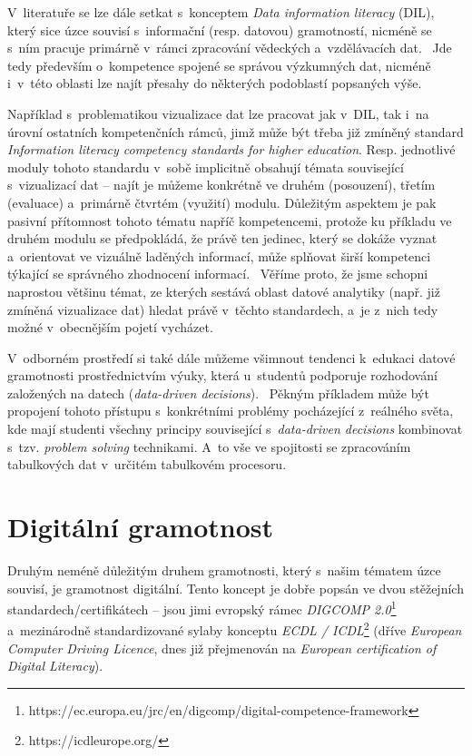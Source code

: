 V~literatuře se lze dále setkat s~konceptem \emph{Data information literacy} (DIL), který sice úzce souvisí s~informační (resp. datovou) gramotností, nicméně se s~ním pracuje primárně v~rámci zpracování vědeckých a~vzdělávacích dat.~\parencite{jeffryes13} Jde tedy především o~kompetence spojené se správou výzkumných dat, nicméně i~v~této oblasti lze najít přesahy do některých podoblastí popsaných výše.

Například s~problematikou vizualizace dat lze pracovat jak v~DIL, tak i~na úrovní ostatních kompetenčních rámců, jimž může být třeba již zmíněný standard \emph{Information literacy competency standards for higher education}. Resp. jednotlivé moduly tohoto standardu v~sobě implicitně obsahují témata související s~vizualizací dat -- najít je můžeme konkrétně ve druhém (posouzení), třetím (evaluace) a~primárně čtvrtém (využití) modulu. Důležitým aspektem je pak pasivní přítomnost tohoto tématu napříč kompetencemi, protože ku příkladu ve druhém modulu se předpokládá, že právě ten jedinec, který se dokáže vyznat a~orientovat ve vizuálně laděných informací, může splňovat širší kompetenci týkající se správného zhodnocení informací.~\parencite{womack14} Věříme proto, že jsme schopni naprostou většinu témat, ze kterých sestává oblast datové analytiky (např. již zmíněná vizualizace dat) hledat právě v~těchto standardech, a~je z~nich tedy možné v~obecnějším pojetí vycházet.

V~odborném prostředí si také dále můžeme všimnout tendenci k~edukaci datové gramotnosti prostřednictvím výuky, která u~studentů podporuje rozhodování založených na datech (\emph{data-driven decisions}).~\parencite{mandinach13} Pěkným příkladem může být propojení tohoto přístupu s~konkrétními problémy pocházející z~reálného světa, kde mají studenti všechny principy související s~\emph{data-driven decisions} kombinovat s~tzv. \emph{problem solving} technikami. A~to vše ve spojitosti se zpracováním tabulkových dat v~určitém tabulkovém procesoru.~\parencite{slayter17}

\hypertarget{digituxe1lnuxed-gramotnost}{%
\section{Digitální gramotnost}\label{digituxe1lnuxed-gramotnost}}

Druhým neméně důležitým druhem gramotnosti, který s~našim tématem úzce souvisí, je gramotnost digitální. Tento koncept je dobře popsán ve dvou stěžejních standardech/certifikátech -- jsou jimi evropský rámec \emph{DIGCOMP 2.0}\footnote{https://ec.europa.eu/jrc/en/digcomp/digital-competence-framework} a~mezinárodně standardizované sylaby konceptu \emph{ECDL / ICDL}\footnote{https://icdleurope.org/} (dříve \emph{European Computer Driving Licence}, dnes již přejmenován na \emph{European certification of Digital Literacy}).

